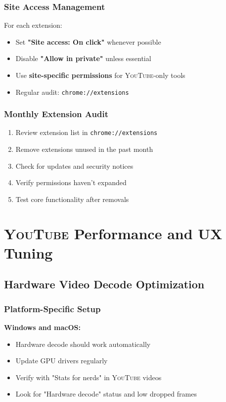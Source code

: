 \documentclass[11pt,a4paper,oneside]{book}
\newcommand{\youtube}{\textsc{YouTube}}
\newcommand{\keystroke}[1]{\texttt{\color{primaryblue}#1}}
\begin{document}
\subsection{Site Access Management}

For each extension:

\begin{itemize}
    \item Set \textbf{"Site access: On click"} whenever possible
    \item Disable \textbf{"Allow in private"} unless essential
    \item Use \textbf{site-specific permissions} for \youtube{}-only tools
    \item Regular audit: \keystroke{chrome://extensions}
\end{itemize}

\subsection{Monthly Extension Audit}

\begin{enumerate}
    \item Review extension list in \keystroke{chrome://extensions}
    \item Remove extensions unused in the past month
    \item Check for updates and security notices
    \item Verify permissions haven't expanded
    \item Test core functionality after removals
\end{enumerate}

\chapter{\youtube{} Performance and UX Tuning}

\section{Hardware Video Decode Optimization}

\subsection{Platform-Specific Setup}

\textbf{Windows and macOS:}
\begin{itemize}
    \item Hardware decode should work automatically
    \item Update GPU drivers regularly
    \item Verify with "Stats for nerds" in \youtube{} videos
    \item Look for "Hardware decode" status and low dropped frames
\end{itemize}
\end{document}
